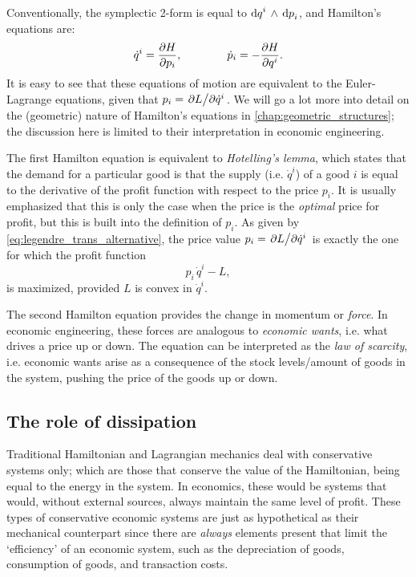Conventionally, the symplectic 2-form is equal to $ \dd{q}^i\,\wedge\,\dd{p}_i $, and Hamilton's equations are:
\begin{equation}
    \dot{q}^i = \pdv{H}{p_i}, \qquad \qquad \dot{p}_i = -\pdv{H}{q^i}.
    \label{eq:legendre_trans_alternative}
\end{equation}
It is easy to see that these equations of motion are equivalent to the Euler-Lagrange equations, given that \(p_i = \pdv*{L}{\dot{q}^i}\). We will go a lot more into detail on the (geometric) nature of Hamilton's equations in \cref{chap:geometric_structures}; the discussion here is limited to their interpretation in economic engineering.

The first Hamilton equation is equivalent to \emph{Hotelling's lemma}, which states that the demand for a particular good is that the supply (i.e. \(\dot{q}^i\)) of a good \(i\) is equal to the derivative of the profit function with respect to the price \(p_i\). It is usually emphasized that this is only the case when the price is the \emph{optimal} price for profit, but this is built into the definition of \(p_i\). As given by \cref{eq:legendre_trans_alternative}, the price value \(p_i = \pdv*{L}{\dot{q}^i}\) is exactly the one for which the profit function
\begin{equation}
     p_i\,\dot{q}^i - L,
\end{equation}
is maximized, provided \(L\) is convex in \(\dot{q}^i\). 

The second Hamilton equation provides the change in momentum or \emph{force}. In economic engineering, these forces are analogous to \emph{economic wants}, i.e. what drives a price up or down. The equation can be interpreted as the \emph{law of scarcity}, i.e. economic wants arise as a consequence of the stock levels/amount of goods in the system, pushing the price of the goods up or down.

\subsection{The role of dissipation} 
Traditional Hamiltonian and Lagrangian mechanics deal with conservative systems only; which are those that conserve the value of the Hamiltonian, being equal to the energy in the system. In economics, these would be systems that would, without external sources, always maintain the same level of profit. These types of conservative economic systems are just as hypothetical as their mechanical counterpart since there are \emph{always} elements present that limit the `efficiency' of an economic system, such as the depreciation of goods, consumption of goods, and transaction costs. 

